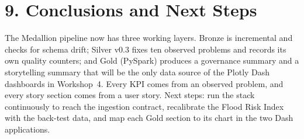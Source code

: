 \documentclass[stu, 12pt, letterpaper, donotrepeattitle, floatsintext, natbib]{apa7}
\begin{document}
\section{\large 9. Conclusions and Next Steps}
The Medallion pipeline now has three working layers. Bronze is incremental and checks for schema drift; Silver v0.3 fixes ten observed problems and records its own quality counters; and Gold (PySpark) produces a governance summary and a storytelling summary that will be the only data source of the Plotly Dash dashboards in Workshop~4. Every KPI comes from an observed problem, and every story section comes from a user story. Next steps: run the stack continuously to reach the ingestion contract, recalibrate the Flood Risk Index with the back-test data, and map each Gold section to its chart in the two Dash applications.

\newpage
\renewcommand\refname{\large\textbf{References}}
\nocite{*}

\end{document}
